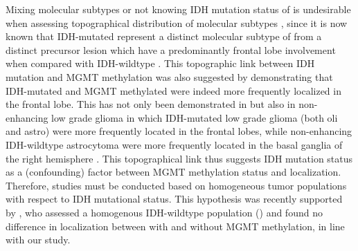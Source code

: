 Mixing molecular subtypes or not knowing \gls{IDH} mutation status of  is undesirable when assessing topographical distribution of molecular subtypes \autocite{louis20162016}, since it is now known that \gls{IDH}-mutated  represent a distinct molecular subtype of  from a distinct precursor lesion which have a predominantly frontal lobe involvement when compared with \gls{IDH}-wildtype  \autocite{lai2011evidence}.
This topographic link between \gls{IDH} mutation and \gls{MGMT} methylation was also suggested by  demonstrating that \gls{IDH}-mutated and \gls{MGMT} methylated  were indeed more frequently localized in the frontal lobe.
This has not only been demonstrated in  but also in non-enhancing low grade glioma in which \gls{IDH}-mutated low grade glioma (both \gls{oli} and \gls{astro}) were more frequently located in the frontal lobes, while non-enhancing \gls{IDH}-wildtype astrocytoma were more frequently located in the basal ganglia of the right hemisphere \autocite{chaichana2011factors}.
This topographical link thus suggests \gls{IDH} mutation status as a (confounding) factor between \gls{MGMT} methylation status and localization.
Therefore, studies must be conducted based on homogeneous \gls{tumor} populations with respect to \gls{IDH} mutational status.
This hypothesis was recently supported by , who assessed a homogenous \gls{IDH}-wildtype  population () and found no difference in localization between  with and without \gls{MGMT} methylation, in line with our study.


